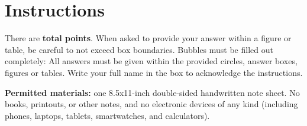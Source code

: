 \section*{Instructions}

There are {\bf {} total points}. When asked to provide your
answer within a figure or table, be careful to not exceed box boundaries.
Bubbles must be filled out completely: 
 All answers must be given within the provided
circles, answer boxes, figures or tables. Write your full name in the box to
acknowledge the instructions.

\vspace{.5em}

\textbf{Permitted materials:} one 8.5x11-inch double-sided handwritten note sheet. No books, printouts, or other notes, and no electronic devices of any kind (including phones, laptops, tablets, smartwatches, and calculators).

\vspace{.5em}

